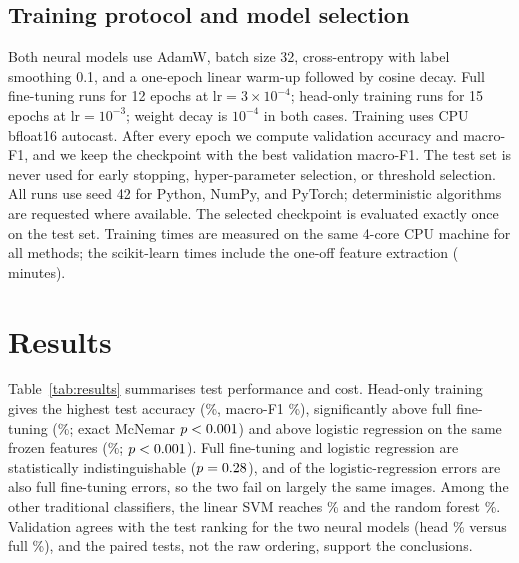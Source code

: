 \documentclass[10pt]{article}
\begin{document}
\subsection{Training protocol and model selection}
Both neural models use AdamW, batch size 32, cross-entropy with label smoothing 0.1, and
a one-epoch linear warm-up followed by cosine decay. Full fine-tuning runs for 12 epochs
at $\mathrm{lr}=3\times10^{-4}$; head-only training runs for 15 epochs at
$\mathrm{lr}=10^{-3}$; weight decay is $10^{-4}$ in both cases. Training uses CPU
bfloat16 autocast. After every epoch we compute validation accuracy and macro-F1, and we
keep the checkpoint with the best validation macro-F1. The test set is never used for
early stopping, hyper-parameter selection, or threshold selection. All runs use seed 42
for Python, NumPy, and PyTorch; deterministic algorithms are requested where available.
The selected checkpoint is evaluated exactly once on the test set. Training times are
measured on the same 4-core CPU machine for all methods; the scikit-learn times include
the one-off feature extraction (\extractTime{} minutes).

\section{Results}
Table~\ref{tab:results} summarises test performance and cost. Head-only training gives
the highest test accuracy (\headAcc\%, macro-F1 \headFone\%), significantly above full
fine-tuning (\fullAcc\%; exact McNemar $p<0.001$) and above logistic regression on
the same frozen features (\lrAcc\%; $p<0.001$). Full fine-tuning and logistic
regression are statistically indistinguishable ($p=0.28$), and
\sharedErrors{} of the \lrErrors{} logistic-regression errors are also full fine-tuning
errors, so the two fail on largely the same images. Among the other traditional
classifiers, the linear SVM reaches \svmAcc\% and the random forest \rfAcc\%. Validation
agrees with the test ranking for the two neural models (head \headVal\% versus full
\fullVal\%), and the paired tests, not the raw ordering, support the conclusions.

\begin{table}[t]
\centering
\caption{Test results (official test split, evaluated once). ``Train acc.'' is accuracy
on the unaugmented training set of the selected checkpoint; ``Gap'' is train minus test
accuracy in percentage points. Times for the scikit-learn rows include the shared
\extractTime-minute feature extraction, and their parameter count is the number of
classifier coefficients ($576\times37+37$); the feature extractor is fixed.}
\label{tab:results}
\footnotesize

\end{table}
\end{document}
